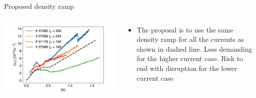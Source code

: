 \documentclass[10pt, compress]{beamer}
\newcommand\Fontvi{\fontsize{8}{7.2}\selectfont}
\begin{document}
\begin{frame}{Proposed density ramp}
\Fontvi
  \begin{columns}
    \begin{column}{0.6\textwidth}
      \includegraphics[width=\textwidth]{../../Experiments/TCV/analysis/pdfbox/ProposedDensityRamp}
    \end{column}
    \begin{column}{0.4\textwidth}
      \begin{itemize}
        \item The proposal is to use the same density ramp for all
          the currents as shown in dashed line. Less demanding for the
          higher current case. Risk to end with disruption for the
          lower current case
      \end{itemize}
    \end{column}
  \end{columns}
  \end{frame}
\end{document}
